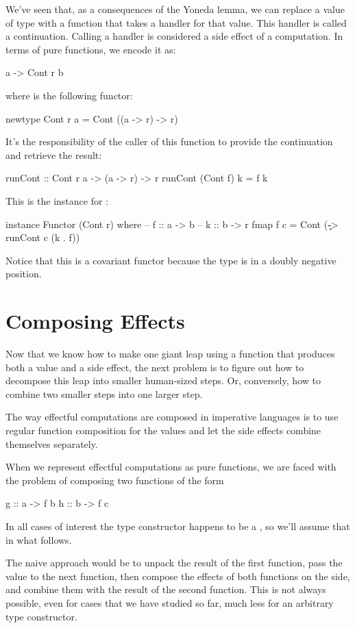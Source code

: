 \documentclass[DaoFP]{subfiles}
\begin{document}
We've seen that, as a consequences of the Yoneda lemma, we can replace a value of type  with a function that takes a handler for that value. This handler is called a continuation. Calling a handler is considered a side effect of a computation. In terms of pure functions, we encode it as:
\begin{haskell}
a -> Cont r b
\end{haskell}
where  is the following functor:
\begin{haskell}
newtype Cont r a = Cont ((a -> r) -> r)
\end{haskell}
It's the responsibility of the caller of this function to provide the continuation and retrieve the result:
\begin{haskell}
runCont :: Cont r a -> (a -> r) -> r
runCont (Cont f) k = f k
\end{haskell}

This is the  instance for :
\begin{haskell}
instance Functor (Cont r) where
  -- f :: a -> b
  -- k :: b -> r
  fmap f c = Cont (\k -> runCont c (k . f))
\end{haskell}
Notice that this is a covariant functor because the type  is in a doubly negative position.

\section{Composing Effects}

Now that we know how to make one giant leap using a function that produces both a value and a side effect, the next problem is to figure out how to decompose this leap into smaller human-sized steps. Or, conversely, how to combine two smaller steps into one larger step. 

The way effectful computations are composed in imperative languages is to use regular function composition for the values and let the side effects combine themselves separately. 

When we represent effectful computations as pure functions, we are faced with the problem of composing two functions of the form
\begin{haskell}
g :: a -> f b
h :: b -> f c
\end{haskell}
In all cases of interest the type constructor  happens to be a , so we'll assume that in what follows.

The naive approach would be to unpack the result of the first function, pass the value to the next function, then compose the effects of both functions on the side, and combine them with the result of the second function. This is not always possible, even for cases that we have studied so far, much less for an arbitrary type constructor.
\end{document}
